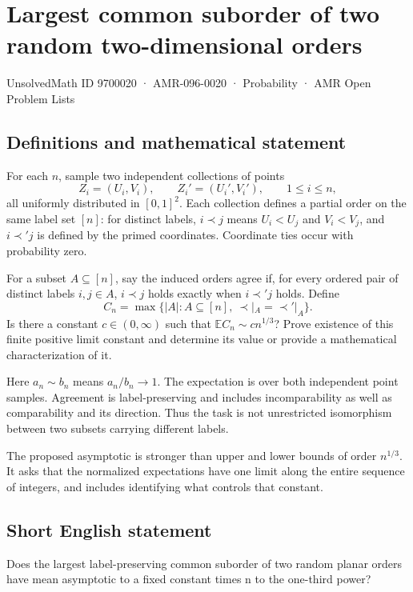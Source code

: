 \documentclass[11pt,a4paper]{article}
\begin{document}
\section*{Largest common suborder of two random two-dimensional orders}\label{9700020}
{\small UnsolvedMath ID 9700020 · AMR-096-0020 · Probability · AMR Open Problem Lists}
\subsection{Definitions and mathematical statement}
For each $n$, sample two independent collections of points
\[
Z_i=(U_i,V_i),\qquad Z_i'=(U_i',V_i'),\qquad 1\le i\le n,
\]
all uniformly distributed in $[0,1]^2$. Each collection defines a partial order on the same label set $[n]$: for distinct labels, $i\prec j$ means $U_i<U_j$ and $V_i<V_j$, and $i\prec'j$ is defined by the primed coordinates. Coordinate ties occur with probability zero.

For a subset $A\subseteq[n]$, say the induced orders agree if, for every ordered pair of distinct labels $i,j\in A$, $i\prec j$ holds exactly when $i\prec'j$ holds. Define
\[
C_n=\max\{|A|:A\subseteq[n],\ \prec|_A=\prec'|_A\}.
\]
Is there a constant $c\in(0,\infty)$ such that $\mathbb EC_n\sim c n^{1/3}$? Prove existence of this finite positive limit constant and determine its value or provide a mathematical characterization of it.

Here $a_n\sim b_n$ means $a_n/b_n\to1$. The expectation is over both independent point samples. Agreement is label-preserving and includes incomparability as well as comparability and its direction. Thus the task is not unrestricted isomorphism between two subsets carrying different labels.

The proposed asymptotic is stronger than upper and lower bounds of order $n^{1/3}$. It asks that the normalized expectations have one limit along the entire sequence of integers, and includes identifying what controls that constant.
\subsection{Short English statement}
Does the largest label-preserving common suborder of two random planar orders have mean asymptotic to a fixed constant times n to the one-third power?
\end{document}
